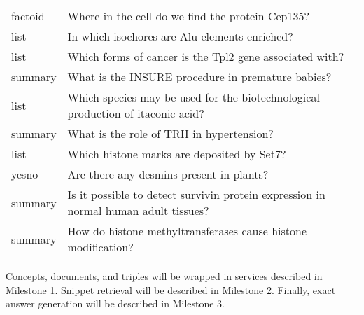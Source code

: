 \begin{table}[h]
\begin{tabular}{lp{32em}}
factoid & Where in the cell do we find the protein Cep135?\\           
list & In which isochores are Alu elements enriched? \\
list & Which forms of cancer is the Tpl2 gene associated with? \\           
summary & What is the INSURE procedure in premature babies?\\         
list & Which species may be used for the biotechnological production of itaconic acid? \\
summary & What is the role of TRH in hypertension? \\
list & Which histone marks are deposited by Set7?\\ 
yesno & Are there any desmins present in plants? \\ 
summary & Is it possible to detect survivin protein expression in normal human adult tissues? \\
summary & How do histone methyltransferases cause histone modification?\\ 
\hline
\end{tabular}
\end{table}

Concepts, documents, and triples will be wrapped in services described in Milestone 1. Snippet retrieval will be described in Milestone 2. Finally, exact answer generation will be described in Milestone 3.
